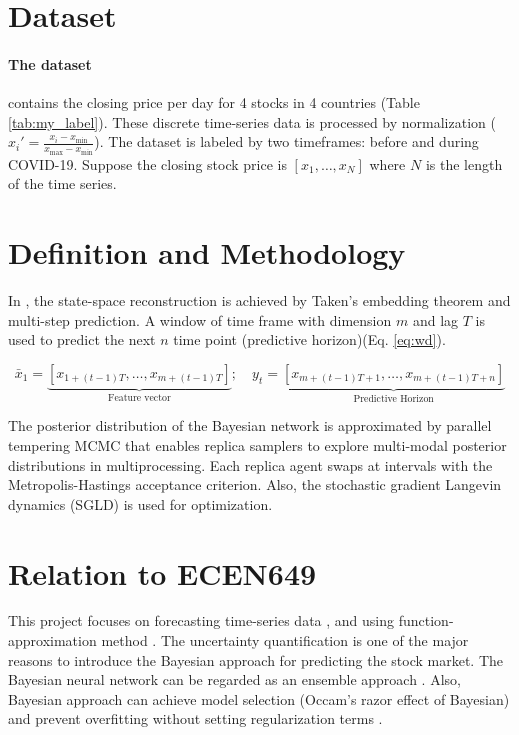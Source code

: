 \documentclass[a4paper]{article}
\begin{document}
\section{Dataset}

\paragraph{The dataset} contains the closing price per day for 4 stocks in 4 countries (Table \ref{tab:my_label}). These discrete time-series data is processed by normalization ($x_{i}' = \frac{x_{i} - x_{\min}}{x_{\max} - x_{\min}}$). The dataset is labeled by two timeframes: before and during COVID-19. Suppose the closing stock price is $[x_1, \dots, x_N]$ where $N$ is the length of the time series.


\section{Definition and Methodology}

In \cite{chandra2021bayesian}, the state-space reconstruction is achieved by Taken's embedding theorem and multi-step prediction. A window of time frame with dimension $m$ and lag $T$ is used to predict the next $n$ time point (predictive horizon)(Eq. \ref{eq:wd}).

\begin{equation}
\bar{x}_1 = \underbrace{[x_{1+(t-1)T}, \dots,x_{m+(t-1)T}]}_{\text{Feature vector}};\quad y_t = \underbrace{[x_{m+(t-1)T + 1}, \dots, x_{m+(t-1)T + n}]}_{\text{Predictive Horizon}}
\label{eq:wd}
\end{equation}

The posterior distribution of the Bayesian network is approximated by parallel tempering MCMC that enables replica samplers to explore multi-modal posterior distributions in multiprocessing\cite{chandra2019langevin, chandra2021bayesian}. Each replica agent swaps at intervals with the Metropolis-Hastings acceptance criterion. Also, the stochastic gradient Langevin dynamics (SGLD) is used for optimization.


\section{Relation to ECEN649}

This project focuses on forecasting time-series data \cite[Ch. 11]{braga2020fundamentals}, and using function-approximation method \cite[Ch. 6]{braga2020fundamentals}. The uncertainty quantification \cite[Ch. 7]{braga2020fundamentals} is one of the major reasons to introduce the Bayesian approach \cite[Ch. 2]{braga2020fundamentals} for predicting the stock market. The Bayesian neural network can be regarded as an ensemble approach \cite[Ch. 3.5]{braga2020fundamentals}. Also, Bayesian approach can achieve model selection (Occam's razor effect of Bayesian) \cite[Ch. 8]{braga2020fundamentals} and prevent overfitting without setting regularization terms \cite[Ch. 6]{braga2020fundamentals}.
\end{document}

